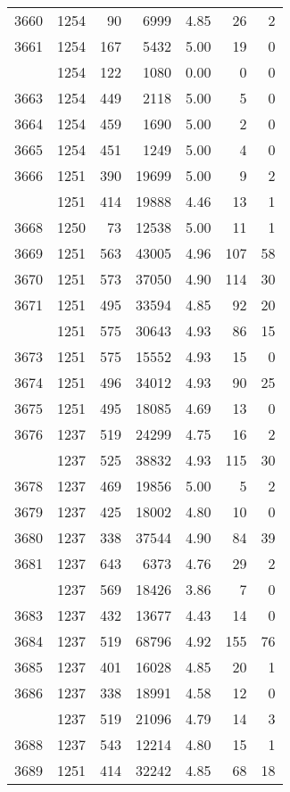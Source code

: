 \documentclass[
]{article}
\begin{document}
\begin{table}
\begin{tabular}[t]{lrrrrrr}
3660 & 1254 & 90 & 6999 & 4.85 & 26 & 2\\
3661 & 1254 & 167 & 5432 & 5.00 & 19 & 0\\
\addlinespace
3662 & 1254 & 122 & 1080 & 0.00 & 0 & 0\\
3663 & 1254 & 449 & 2118 & 5.00 & 5 & 0\\
3664 & 1254 & 459 & 1690 & 5.00 & 2 & 0\\
3665 & 1254 & 451 & 1249 & 5.00 & 4 & 0\\
3666 & 1251 & 390 & 19699 & 5.00 & 9 & 2\\
\addlinespace
3667 & 1251 & 414 & 19888 & 4.46 & 13 & 1\\
3668 & 1250 & 73 & 12538 & 5.00 & 11 & 1\\
3669 & 1251 & 563 & 43005 & 4.96 & 107 & 58\\
3670 & 1251 & 573 & 37050 & 4.90 & 114 & 30\\
3671 & 1251 & 495 & 33594 & 4.85 & 92 & 20\\
\addlinespace
3672 & 1251 & 575 & 30643 & 4.93 & 86 & 15\\
3673 & 1251 & 575 & 15552 & 4.93 & 15 & 0\\
3674 & 1251 & 496 & 34012 & 4.93 & 90 & 25\\
3675 & 1251 & 495 & 18085 & 4.69 & 13 & 0\\
3676 & 1237 & 519 & 24299 & 4.75 & 16 & 2\\
\addlinespace
3677 & 1237 & 525 & 38832 & 4.93 & 115 & 30\\
3678 & 1237 & 469 & 19856 & 5.00 & 5 & 2\\
3679 & 1237 & 425 & 18002 & 4.80 & 10 & 0\\
3680 & 1237 & 338 & 37544 & 4.90 & 84 & 39\\
3681 & 1237 & 643 & 6373 & 4.76 & 29 & 2\\
\addlinespace
3682 & 1237 & 569 & 18426 & 3.86 & 7 & 0\\
3683 & 1237 & 432 & 13677 & 4.43 & 14 & 0\\
3684 & 1237 & 519 & 68796 & 4.92 & 155 & 76\\
3685 & 1237 & 401 & 16028 & 4.85 & 20 & 1\\
3686 & 1237 & 338 & 18991 & 4.58 & 12 & 0\\
\addlinespace
3687 & 1237 & 519 & 21096 & 4.79 & 14 & 3\\
3688 & 1237 & 543 & 12214 & 4.80 & 15 & 1\\
3689 & 1251 & 414 & 32242 & 4.85 & 68 & 18\\

\end{tabular}
\end{table}
\end{document}
